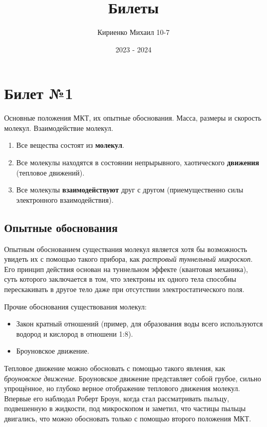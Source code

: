 \documentclass{article}
\title{Билеты}
\author{Кириенко Михаил 10-7}
\date{2023 - 2024}
\begin{document}
\maketitle
\tableofcontents
\newpage

\section{Билет №1}
Основные положения МКТ, их опытные обоснования. Масса, размеры и скорость молекул. Взаимодействие молекул. 



\begin{tcolorbox}[title=Основные положения МКТ, colback=blue!5!white, colframe=blue!50!black] 
\begin{enumerate}
  \item Все вещества состоят из \textbf{молекул}. 
  \item Все молекулы находятся в состоянии непрырывного, хаотического \textbf{движения} (тепловое движений). 
  \item Все молекулы \textbf{взаимодействуют} друг с другом (приемущественно силы электронного взаимодействия).
\end{enumerate}
\end{tcolorbox}

\subsection{Опытные обоснования}


Опытным обоснованием существания молекул является хотя бы возможность увидеть их с помощью такого прибора, как 
\textit{растровый туннельный микроскоп}. Его принцип действия основан на туннельном эффекте (квантовая механика), 
суть которого заключается в том, что электроны их одного тела способны перескакивать в другое тело даже при отсутствии
электростатического поля. 

\noindent Прочие обоснования существования молекул:
\begin{itemize}
  \item Закон кратный отношений (пример, для образования воды всего используются водород и кислород в отношени 1:8). 
  \item Броуновское движение. 
\end{itemize}

Тепловое движение можно обосновать с помощью такого явления, как \textit{броуновское движение}. Броуновское движение
представляет собой грубое, сильно упрощённое, но глубоко верное отображение теплового движения молекул. Впервые
его наблюдал Роберт Броун, когда стал рассматривать пыльцу, подвешенную в жидкости, под микроскопом и заметил, что частицы 
пыльцы двигались, что можно обосновать только с помощью второго положения МКТ.
\end{document}
